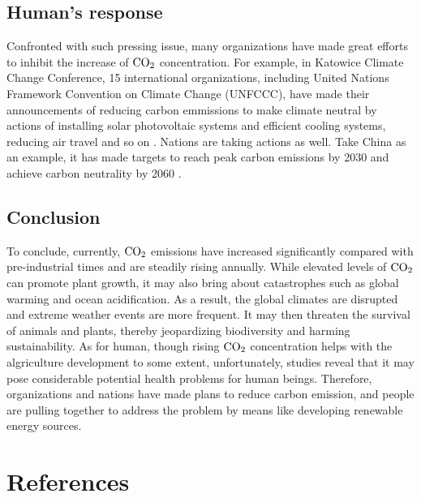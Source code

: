 \documentclass[12pt,a4paper]{article}
\begin{document}
    \subsection{Human's response}
    Confronted with such pressing issue, many organizations have made great efforts to inhibit the increase of $\ce{CO2}$ concentration. For example, in Katowice Climate Change Conference, 15 international organizations, including United Nations Framework Convention on Climate Change (UNFCCC), have made their announcements of reducing carbon emmissions to make climate neutral by actions of installing solar photovoltaic systems and efficient cooling systems, reducing air travel and so on \citep{unfccc_15_2018}. Nations are taking actions as well. Take China as an example, it has made targets to reach peak carbon emissions by 2030 and achieve carbon neutrality by 2060 \citep{xinhua_responding_2021}.
    
    \subsection{Conclusion}
    To conclude, currently, $\ce{CO2}$ emissions have increased significantly compared with pre-industrial times and are steadily rising annually. While elevated levels of $\ce{CO2}$ can promote plant growth, it may also bring about catastrophes such as global warming and ocean acidification. As a result, the global climates are disrupted and extreme weather events are more frequent. It may then threaten the survival of animals and plants, thereby jeopardizing biodiversity and harming sustainability. As for human, though rising $\ce{CO2}$ concentration helps with the algriculture development to some extent, unfortunately, studies reveal that it may pose considerable potential health problems for human beings. Therefore, organizations and nations have made plans to reduce carbon emission, and people are pulling together to address the problem by means like developing renewable energy sources.

    
    \newpage
    \section{References}
    
    
    
\end{document}
